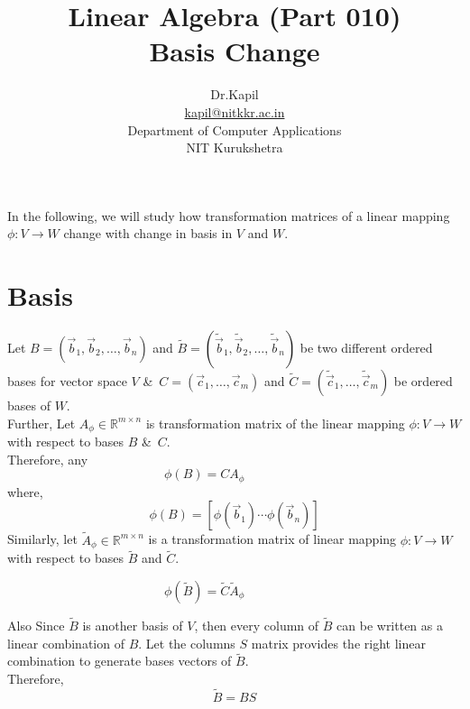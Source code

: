 \documentclass[12pt]{article}
\title{\textbf{Linear Algebra (Part 010)}\\[1ex]
\large Basis Change}
\author{Dr.Kapil\\\href{mailto:kapil@nitkkr.ac.in}{kapil@nitkkr.ac.in}\\Department of Computer Applications\\NIT Kurukshetra}
\begin{document}
\maketitle

In the following, we will study how transformation matrices of a linear mapping $\phi: V \to W$ change with change in basis in $V$ and $W$.

\section*{Basis}

Let $B = (\vec{b}_1, \vec{b}_2, \ldots, \vec{b}_n)$ and $\tilde{B} = (\tilde{\vec{b}}_1, \tilde{\vec{b}}_2, \ldots, \tilde{\vec{b}}_n)$ be two different ordered bases for vector space $V$ \&\ $C = (\vec{c}_1, \ldots, \vec{c}_m)$ and $\tilde{C} = (\tilde{\vec{c}}_1, \ldots, \tilde{\vec{c}}_m)$ be ordered bases of $W$.\\ Further, Let $A_\phi \in \mathbb{R}^{m\times n}$ is transformation matrix of the linear mapping $\phi: V \to W$ with respect to bases $B$ \&\ $C$.
\\Therefore, any 
\begin{equation}
\phi(B) = C A_\phi \hspace{2cm}
\end{equation}
where,
$$
 \phi(B) = [\phi(\vec{b}_1) \cdots \phi(\vec{b}_n)]
$$
Similarly, let $\tilde{A}_\phi \in \mathbb{R}^{m \times n}$ is a transformation matrix of linear mapping $\phi: V \to W$ with respect to bases $\tilde{B}$ and $\tilde{C}$.

\begin{equation}
\phi(\tilde{B}) = \tilde{C} \tilde{A}_\phi \hspace{2cm}
\end{equation}

Also Since $\tilde{B}$ is another basis of $V$, then every column of $\tilde{B}$ can be written as a linear combination of $B$. Let the columns $S$ matrix provides the right linear combination to generate bases vectors of $\tilde{B}$.
\\Therefore, 
\begin{equation}
\tilde{B}=BS
\end{equation}
\end{document}
